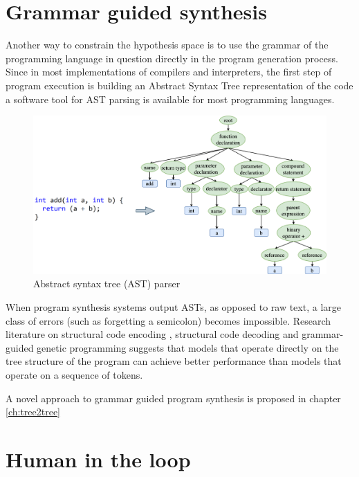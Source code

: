 \newpage
\section{Grammar guided synthesis}
\label{sec:grammar-guided}

Another way to constrain the hypothesis space is to use the grammar of the programming language in question directly in the program generation process.
Since in most implementations of compilers and interpreters, the first step of program execution is building an Abstract Syntax Tree representation of the code a software tool for AST parsing is available for most programming languages.

\begin{figure}[H]
    \centering
    \includegraphics[width=\linewidth]{images/ast.png}
    \caption{Abstract syntax tree (AST) parser}
    \label{fig:ast-parser}
\end{figure}

When program synthesis systems  output ASTs, as opposed to raw text, a large class of errors (such as forgetting a semicolon) becomes impossible. 
Research literature on structural code encoding \cite{alon2019structural,zhang2015tree}, structural code decoding \cite{jiang2021ast,zhu2019grammarcnn} and grammar-guided genetic programming \cite{bunelLeveragingGrammarReinforcement2018, manriqueGrammarguidedGeneticProgramming2009, sobaniaChallengesProgramSynthesis2020a} suggests that models that operate directly on the tree structure of the program can achieve better performance than models that operate on a sequence of tokens.


A novel approach to grammar guided program synthesis is proposed in chapter \ref{ch:tree2tree}

\newpage
\section{Human in the loop}
\label{sec:human}

